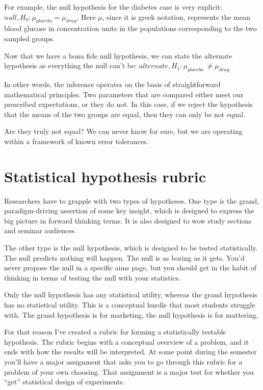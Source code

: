 \documentclass[]{book}
\begin{document}
For example, the null hypothesis for the diabetes case is very explicit: \(null, H_0: \mu_{placebo} = \mu_{drug}\), Here \(\mu\), since it is greek notation, represents the mean blood glucose in concentration units in the populations corresponding to the two sampled groups.

Now that we have a bona fide null hypothesis, we can state the alternate hypothesis as everything the null can't be: \(alternate, H_1: \mu_{placebo}\ \ne \mu_{drug}\)

In other words, the inference operates on the basis of straightforward mathematical principles. Two parameters that are compared either meet our prescribed expectations, or they do not. In this case, if we reject the hypothesis that the means of the two groups are equal, then they can only be not equal.

Are they truly not equal? We can never know for sure, but we are operating within a framework of known error tolerances.

\hypertarget{statistical-hypothesis-rubric}{%
\section{Statistical hypothesis rubric}\label{statistical-hypothesis-rubric}}

Researchers have to grapple with two types of hypotheses. One type is the grand, paradigm-driving assertion of some key insight, which is designed to express the big picture in forward thinking terms. It is also designed to wow study sections and seminar audiences.

The other type is the null hypothesis, which is designed to be tested statistically. The null predicts nothing will happen. The null is as boring as it gets. You'd never propose the null in a specific aims page, but you should get in the habit of thinking in terms of testing the null with your statistics.

Only the null hypothesis has any statistical utility, whereas the grand hypothesis has no statistical utility. This is a conceptual hurdle that most students struggle with. The grand hypothesis is for marketing, the null hypothesis is for mattering.

For that reason I've created a rubric for forming a statistically testable hypothesis. The rubric begins with a conceptual overview of a problem, and it ends with how the results will be interpreted. At some point during the semester you'll have a major assignment that asks you to go through this rubric for a problem of your own choosing. That assignment is a major test for whether you ``get'' statistical design of experiments.
\end{document}
